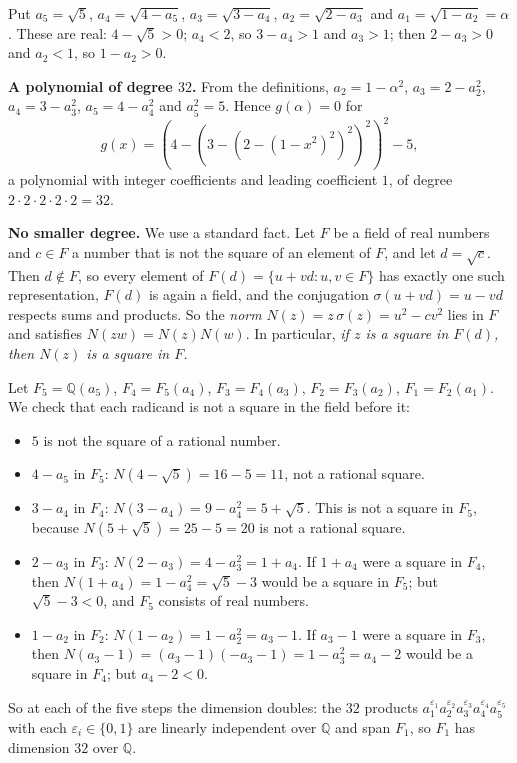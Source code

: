 Put $a_5=\sqrt5$, $a_4=\sqrt{4-a_5}$, $a_3=\sqrt{3-a_4}$, $a_2=\sqrt{2-a_3}$ and $a_1=\sqrt{1-a_2}=\alpha$. These are real: $4-\sqrt5>0$; $a_4<2$, so $3-a_4>1$ and $a_3>1$; then $2-a_3>0$ and $a_2<1$, so $1-a_2>0$.

\textbf{A polynomial of degree $32$.} From the definitions, $a_2=1-\alpha^2$, $a_3=2-a_2^2$, $a_4=3-a_3^2$, $a_5=4-a_4^2$ and $a_5^2=5$. Hence $g(\alpha)=0$ for
\[g(x)=\left(4-\left(3-\left(2-\left(1-x^2\right)^2\right)^2\right)^2\right)^2-5,\]
a polynomial with integer coefficients and leading coefficient $1$, of degree $2\cdot2\cdot2\cdot2\cdot2=32$.

\textbf{No smaller degree.} We use a standard fact. Let $F$ be a field of real numbers and $c\in F$ a number that is not the square of an element of $F$, and let $d=\sqrt c$. Then $d\notin F$, so every element of $F(d)=\{u+vd:u,v\in F\}$ has exactly one such representation, $F(d)$ is again a field, and the conjugation $\sigma(u+vd)=u-vd$ respects sums and products. So the \emph{norm} $N(z)=z\,\sigma(z)=u^2-cv^2$ lies in $F$ and satisfies $N(zw)=N(z)N(w)$. In particular, \emph{if $z$ is a square in $F(d)$, then $N(z)$ is a square in $F$.}

Let $F_5=\mathbb Q(a_5)$, $F_4=F_5(a_4)$, $F_3=F_4(a_3)$, $F_2=F_3(a_2)$, $F_1=F_2(a_1)$. We check that each radicand is not a square in the field before it:
\begin{itemize}
\item $5$ is not the square of a rational number.
\item $4-a_5$ in $F_5$: $N(4-\sqrt5)=16-5=11$, not a rational square.
\item $3-a_4$ in $F_4$: $N(3-a_4)=9-a_4^2=5+\sqrt5$. This is not a square in $F_5$, because $N(5+\sqrt5)=25-5=20$ is not a rational square.
\item $2-a_3$ in $F_3$: $N(2-a_3)=4-a_3^2=1+a_4$. If $1+a_4$ were a square in $F_4$, then $N(1+a_4)=1-a_4^2=\sqrt5-3$ would be a square in $F_5$; but $\sqrt5-3<0$, and $F_5$ consists of real numbers.
\item $1-a_2$ in $F_2$: $N(1-a_2)=1-a_2^2=a_3-1$. If $a_3-1$ were a square in $F_3$, then $N(a_3-1)=(a_3-1)(-a_3-1)=1-a_3^2=a_4-2$ would be a square in $F_4$; but $a_4-2<0$.
\end{itemize}
So at each of the five steps the dimension doubles: the $32$ products $a_1^{\varepsilon_1}a_2^{\varepsilon_2}a_3^{\varepsilon_3}a_4^{\varepsilon_4}a_5^{\varepsilon_5}$ with each $\varepsilon_i\in\{0,1\}$ are linearly independent over $\mathbb Q$ and span $F_1$, so $F_1$ has dimension $32$ over $\mathbb Q$.

